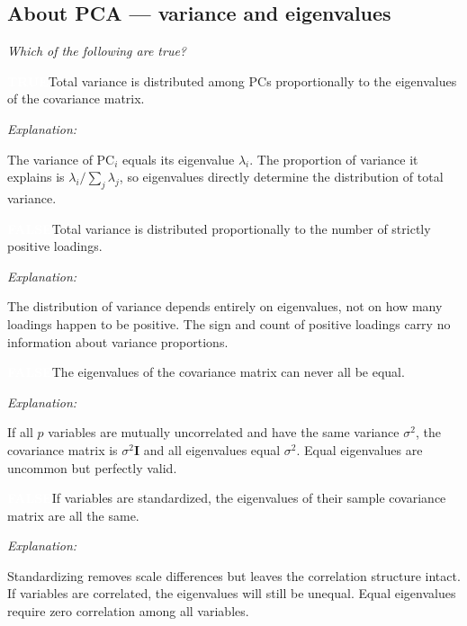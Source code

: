\documentclass[12pt, a4paper]{article}
\newcommand{\truelabel}{\textcolor{white}{\colorbox{truegreen}{\textbf{TRUE}}}}
\newcommand{\falselabel}{\textcolor{white}{\colorbox{falsered}{\textbf{FALSE}}}}
\newenvironment{statement}[1]{%
  \par\medskip
  \noindent #1\par\smallskip
  \noindent
}{\par}
\newenvironment{explanation}{%
  \noindent\small\color{headergray}\textit{Explanation: }%
}{\par}
\begin{document}
\subsection{About PCA --- variance and eigenvalues}

\textit{Which of the following are true?}

\bigskip

\begin{statement}{\truelabel\quad Total variance is distributed among PCs proportionally to the eigenvalues of the covariance matrix.}
\begin{explanation}
The variance of PC$_i$ equals its eigenvalue $\lambda_i$. The proportion of variance it explains is $\lambda_i / \sum_j \lambda_j$, so eigenvalues directly determine the distribution of total variance.
\end{explanation}
\end{statement}

\begin{statement}{\falselabel\quad Total variance is distributed proportionally to the number of strictly positive loadings.}
\begin{explanation}
The distribution of variance depends entirely on eigenvalues, not on how many loadings happen to be positive. The sign and count of positive loadings carry no information about variance proportions.
\end{explanation}
\end{statement}

\begin{statement}{\falselabel\quad The eigenvalues of the covariance matrix can never all be equal.}
\begin{explanation}
If all $p$ variables are mutually uncorrelated and have the same variance $\sigma^2$, the covariance matrix is $\sigma^2 \mathbf{I}$ and all eigenvalues equal $\sigma^2$. Equal eigenvalues are uncommon but perfectly valid.
\end{explanation}
\end{statement}

\begin{statement}{\falselabel\quad If variables are standardized, the eigenvalues of their sample covariance matrix are all the same.}
\begin{explanation}
Standardizing removes scale differences but leaves the correlation structure intact. If variables are correlated, the eigenvalues will still be unequal. Equal eigenvalues require zero correlation among all variables.
\end{explanation}
\end{statement}
\end{document}
